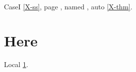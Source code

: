 \documentclass{article}
\begin{document}
CaseI \ref{X-ss}, page \pageref{X-front}, named ,
auto \autoref{X-thm}.

\section{Here}\label{here}
Local \ref{here}.
\end{document}
